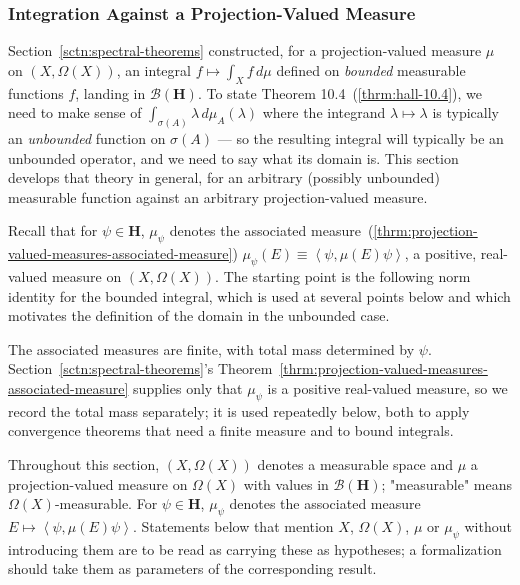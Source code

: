 \subsubsection{Integration Against a Projection-Valued Measure}
Section~\ref{sctn:spectral-theorems} constructed, for a projection-valued measure $\mu$ on $(X, \Omega(X))$, an integral $f \mapsto \int_X f \, d\mu$ defined on \textit{bounded} measurable functions $f$, landing in $\mathcal{B}(\mathbf{H})$. To state Theorem 10.4~(\ref{thrm:hall-10.4}), we need to make sense of $\int_{\sigma(A)} \lambda \, d\mu_A(\lambda)$ where the integrand $\lambda \mapsto \lambda$ is typically an \textit{unbounded} function on $\sigma(A)$ — so the resulting integral will typically be an unbounded operator, and we need to say what its domain is. This section develops that theory in general, for an arbitrary (possibly unbounded) measurable function against an arbitrary projection-valued measure.

Recall that for $\psi \in \mathbf{H}$, $\mu_\psi$ denotes the associated measure~(\ref{thrm:projection-valued-measures-associated-measure}) $\mu_\psi(E) \equiv \left< \psi, \mu(E)\psi \right>$, a positive, real-valued measure on $(X, \Omega(X))$. The starting point is the following norm identity for the bounded integral, which is used at several points below and which motivates the definition of the domain in the unbounded case.

The associated measures are finite, with total mass determined by $\psi$. Section~\ref{sctn:spectral-theorems}'s Theorem~\ref{thrm:projection-valued-measures-associated-measure} supplies only that $\mu_\psi$ is a positive real-valued measure, so we record the total mass separately; it is used repeatedly below, both to apply convergence theorems that need a finite measure and to bound integrals.

\begin{convention}
    \label{conv:section-integration}
    Throughout this section, $(X,\Omega(X))$ denotes a measurable space and $\mu$ a projection-valued measure on $\Omega(X)$ with values in $\mathcal{B}(\mathbf{H})$; "measurable" means $\Omega(X)$-measurable. For $\psi \in \mathbf{H}$, $\mu_\psi$ denotes the associated measure $E \mapsto \left< \psi, \mu(E)\psi \right>$. Statements below that mention $X$, $\Omega(X)$, $\mu$ or $\mu_\psi$ without introducing them are to be read as carrying these as hypotheses; a formalization should take them as parameters of the corresponding result.
\end{convention}

